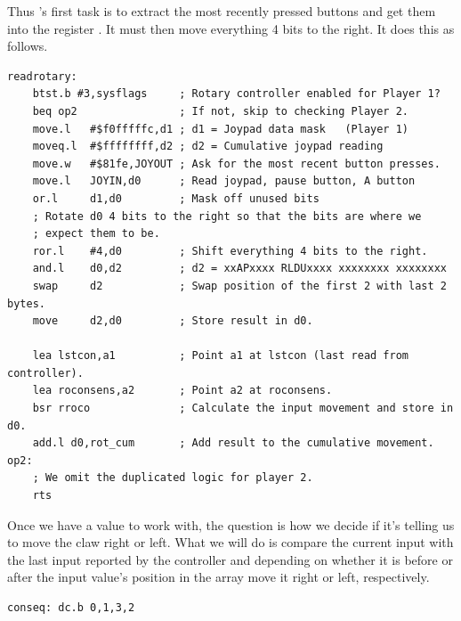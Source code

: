 Thus 's first task is to extract the most recently pressed buttons and get them
into the register . It must then move everything 4 bits to the right. It does this as follows.
\begin{lstlisting}
readrotary:
    btst.b #3,sysflags     ; Rotary controller enabled for Player 1?
    beq op2                ; If not, skip to checking Player 2.
    move.l   #$f0fffffc,d1 ; d1 = Joypad data mask   (Player 1)
    moveq.l  #$ffffffff,d2 ; d2 = Cumulative joypad reading
    move.w   #$81fe,JOYOUT ; Ask for the most recent button presses.
    move.l   JOYIN,d0      ; Read joypad, pause button, A button
    or.l     d1,d0         ; Mask off unused bits
    ; Rotate d0 4 bits to the right so that the bits are where we
    ; expect them to be.
    ror.l    #4,d0         ; Shift everything 4 bits to the right.
    and.l    d0,d2         ; d2 = xxAPxxxx RLDUxxxx xxxxxxxx xxxxxxxx
    swap     d2            ; Swap position of the first 2 with last 2 bytes.
    move     d2,d0         ; Store result in d0.

    lea lstcon,a1          ; Point a1 at lstcon (last read from controller).
    lea roconsens,a2       ; Point a2 at roconsens.
    bsr rroco              ; Calculate the input movement and store in d0.
    add.l d0,rot_cum       ; Add result to the cumulative movement.
op2:
    ; We omit the duplicated logic for player 2.
    rts
\end{lstlisting}
Once we have a value to work with, the question is how we decide if it's telling us to move the 
claw right or left. What we will do is compare the current input with the last input reported
by the controller and depending on whether it is before or after the input value's position in
the  array move it right or left, respectively.

\begin{lstlisting}
conseq: dc.b 0,1,3,2
\end{lstlisting}

